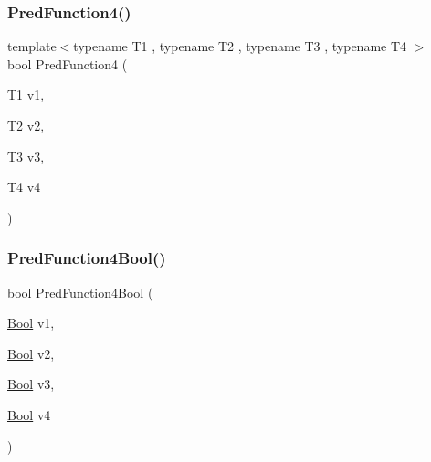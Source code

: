 \mbox{\label{_obj__test_2lib_2googletest-release-1_88_81_2googletest_2test_2gtest__pred__impl__unittest_8cc_a69db8bec40f25365dbd42dbe6c3319fe}} 
\subsubsection{\texorpdfstring{PredFunction4()}{PredFunction4()}}
{\footnotesize\ttfamily template$<$typename T1 , typename T2 , typename T3 , typename T4 $>$ \\
bool Pred\+Function4 (\begin{DoxyParamCaption}\item[{T1}]{v1,  }\item[{T2}]{v2,  }\item[{T3}]{v3,  }\item[{T4}]{v4 }\end{DoxyParamCaption})}

\mbox{\label{_obj__test_2lib_2googletest-release-1_88_81_2googletest_2test_2gtest__pred__impl__unittest_8cc_a5d842d3bce2d16793299e77d1cb5c980}} 
\subsubsection{\texorpdfstring{PredFunction4Bool()}{PredFunction4Bool()}}
{\footnotesize\ttfamily bool Pred\+Function4\+Bool (\begin{DoxyParamCaption}\item[{\mbox{\hyperlink{struct_bool}{Bool}}}]{v1,  }\item[{\mbox{\hyperlink{struct_bool}{Bool}}}]{v2,  }\item[{\mbox{\hyperlink{struct_bool}{Bool}}}]{v3,  }\item[{\mbox{\hyperlink{struct_bool}{Bool}}}]{v4 }\end{DoxyParamCaption})}

